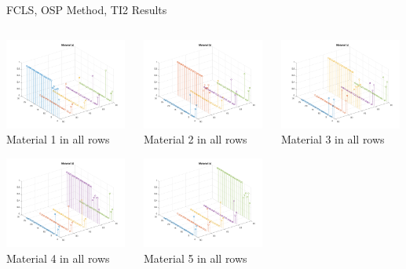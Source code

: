 \documentclass{beamer}
\begin{document}
\begin{frame}{FCLS, OSP Method, TI2 Results}
\begin{columns}
    \begin{column}{0.33\textwidth}
        \includegraphics[width=4cm,center]{osp_fcls_ti2_material_stem_1}
        \\ Material 1 in all rows
        \centering

        \includegraphics[width=4cm,center]{osp_fcls_ti2_material_stem_4}
        \\ Material 4 in all rows
        \centering
    \end{column}
    \begin{column}{0.33\textwidth}
        \includegraphics[width=4cm,center]{osp_fcls_ti2_material_stem_2}
        \\ Material 2 in all rows
        \centering

        \includegraphics[width=4cm,center]{osp_fcls_ti2_material_stem_5}
        \\ Material 5 in all rows
        \centering
    \end{column}
    \begin{column}{0.33\textwidth}
        \includegraphics[width=4cm,center]{osp_fcls_ti2_material_stem_3}
        \\ Material 3 in all rows
        \centering


\end{column}
\end{columns}
\end{frame}
\end{document}
